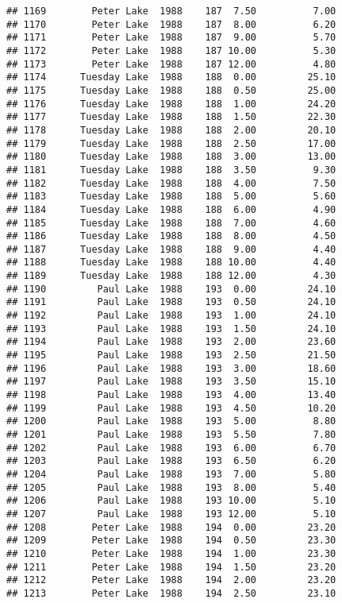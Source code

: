 \documentclass[
]{article}
\begin{document}
\begin{verbatim}
## 1169        Peter Lake  1988    187  7.50          7.00
## 1170        Peter Lake  1988    187  8.00          6.20
## 1171        Peter Lake  1988    187  9.00          5.70
## 1172        Peter Lake  1988    187 10.00          5.30
## 1173        Peter Lake  1988    187 12.00          4.80
## 1174      Tuesday Lake  1988    188  0.00         25.10
## 1175      Tuesday Lake  1988    188  0.50         25.00
## 1176      Tuesday Lake  1988    188  1.00         24.20
## 1177      Tuesday Lake  1988    188  1.50         22.30
## 1178      Tuesday Lake  1988    188  2.00         20.10
## 1179      Tuesday Lake  1988    188  2.50         17.00
## 1180      Tuesday Lake  1988    188  3.00         13.00
## 1181      Tuesday Lake  1988    188  3.50          9.30
## 1182      Tuesday Lake  1988    188  4.00          7.50
## 1183      Tuesday Lake  1988    188  5.00          5.60
## 1184      Tuesday Lake  1988    188  6.00          4.90
## 1185      Tuesday Lake  1988    188  7.00          4.60
## 1186      Tuesday Lake  1988    188  8.00          4.50
## 1187      Tuesday Lake  1988    188  9.00          4.40
## 1188      Tuesday Lake  1988    188 10.00          4.40
## 1189      Tuesday Lake  1988    188 12.00          4.30
## 1190         Paul Lake  1988    193  0.00         24.10
## 1191         Paul Lake  1988    193  0.50         24.10
## 1192         Paul Lake  1988    193  1.00         24.10
## 1193         Paul Lake  1988    193  1.50         24.10
## 1194         Paul Lake  1988    193  2.00         23.60
## 1195         Paul Lake  1988    193  2.50         21.50
## 1196         Paul Lake  1988    193  3.00         18.60
## 1197         Paul Lake  1988    193  3.50         15.10
## 1198         Paul Lake  1988    193  4.00         13.40
## 1199         Paul Lake  1988    193  4.50         10.20
## 1200         Paul Lake  1988    193  5.00          8.80
## 1201         Paul Lake  1988    193  5.50          7.80
## 1202         Paul Lake  1988    193  6.00          6.70
## 1203         Paul Lake  1988    193  6.50          6.20
## 1204         Paul Lake  1988    193  7.00          5.80
## 1205         Paul Lake  1988    193  8.00          5.40
## 1206         Paul Lake  1988    193 10.00          5.10
## 1207         Paul Lake  1988    193 12.00          5.10
## 1208        Peter Lake  1988    194  0.00         23.20
## 1209        Peter Lake  1988    194  0.50         23.30
## 1210        Peter Lake  1988    194  1.00         23.30
## 1211        Peter Lake  1988    194  1.50         23.20
## 1212        Peter Lake  1988    194  2.00         23.20
## 1213        Peter Lake  1988    194  2.50         23.10

\end{verbatim}
\end{document}
